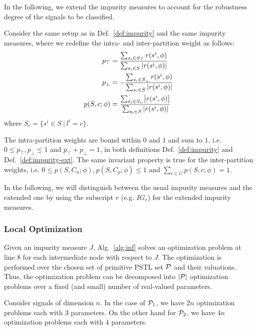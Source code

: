 In the following, we extend the impurity measures
to account for the robustness degree of the signals
to be classified.

\begin{definition}
\label{def:impurity-ext}
Consider the same setup as in Def.~\ref{def:impurity}
and the same impurity measures, where we redefine
the intra- and inter-partition weight as follows:
\begin{align}
p_\top &= \frac{\sum_{s_i \in S_\top} r(s^i, \phi)}{\sum_{s_i \in S} \left| {r(s^i, \phi)} \right|}\\
p_\perp &= -\frac{\sum_{s_i \in S_\perp} r(s^i, \phi)}{\sum_{s_i \in S} \left| {r(s^i, \phi)} \right|}\\
p(S, c;\phi) &=  \frac{\sum_{s_i \in S_c} \left| {r(s^i, \phi)} \right|}{\sum_{s_i \in S} \left| {r(s^i, \phi)} \right|}
\end{align}
where $S_c = \{ s^i  \in S\ |\ l^i = c \}$.
\end{definition}

\begin{proposition}
The intra-partition weights are bound within $0$ and $1$ and sum to $1$, i.e. $0 \leq p_\top,  p_\perp \leq 1$ and $p_\top + p_\perp = 1$, in both definitions Def.~\ref{def:impurity} and Def.~\ref{def:impurity-ext}.
The same invariant property is true for the inter-partition weights, i.e. $0 \leq p(S, C_n; \phi), p(S, C_p; \phi) \leq 1$ and $\sum_{c\in C} p(S, c; \phi) = 1$.
\end{proposition}

In the following, we will distinguish
between the usual impurity measures and the
extended one by using the subscript $r$ (e.g. $IG_r$)
for the extended impurity measures.

\subsubsection{Local Optimization}

Given an impurity measure $J$, Alg.~\ref{alg:inf}
solves an optimization problem at line 8 for
each intermediate node with respect to $J$.
The optimization is performed over the
chosen set of primitive PSTL set $\mathcal{P}$
and their valuations. Thus, the optimization
problem can be decomposed into $\left| {\mathcal{P}} \right|$
optimization problems over a fixed (and small)
number of real-valued parameters.

Consider signals of dimension $n$.
In the case of $\mathcal{P}_1$, we have $2n$
optimization problems each with 3 parameters.
On the other hand for $\mathcal{P}_2$, we have
$4n$ optimization problems each with 4
parameters.


